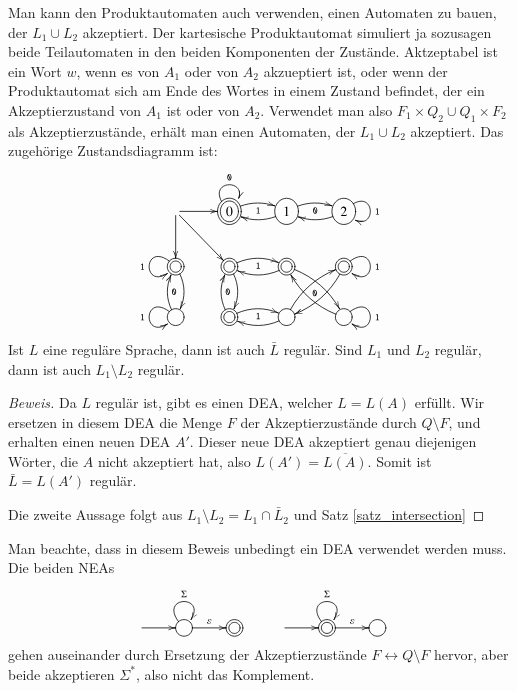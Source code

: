 Man kann den Produktautomaten auch
verwenden, einen Automaten zu bauen, der $L_1\cup L_2$
akzeptiert.
Der kartesische Produktautomat simuliert ja sozusagen
beide Teilautomaten in den beiden Komponenten der Zustände.
Aktzeptabel ist ein Wort $w$, wenn es von $A_1$
oder von $A_2$ akzueptiert ist, oder wenn der Produktautomat
sich am Ende des Wortes in einem Zustand befindet, der ein
Akzeptierzustand von $A_1$ ist oder von $A_2$.
Verwendet
man also $F_1\times Q_2\cup Q_1\times F_2$ als Akzeptierzustände,
erhält man einen Automaten, der $L_1\cup L_2$ akzeptiert.
Das zugehörige Zustandsdiagramm ist:
\[
\entrymodifiers={++[o][F]}
\xymatrix{
*+\txt{} \ar[r] \ar[d] \ar[dr]
	&*++[o][F=]{0} \ar@/^/[r]_{\tt 1} \ar@(ul,ur)^{\tt 0}
		&{1} \ar@/^/[l] \ar@/^/[r]_{\tt 0}
			&{2}\ar@(ur,dr)^{\tt 1} \ar@/^/[l]
\\
*++[o][F=]{} \ar@/^/[d] \ar@(ul,dl)_{\tt 1}
	&*++[o][F=]{} \ar@/^/[d]{\tt 0} \ar@/^/[r]_{\tt 1}
		&*++[o][F=]{} \ar@/^/[l] \ar@/^/[dr]_{\tt 0}
			&*++[o][F=]{}\ar@(ur,dr)^{\tt 1} \ar@/^/[dl]
\\
{} \ar@/^/[u]_{\tt 0} \ar@(ul,dl)_{\tt 1}
	&*++[o][F=]{} \ar@/^/[u]_{\tt 0} \ar@/^/[r]_{\tt 1}
		&{} \ar@/^/[l] \ar@/^/[ur]
			&{}\ar@(ur,dr)^{\tt 1} \ar@/^/[ul]
}
\]

\begin{satz}
\label{satz_regcomplement}
Ist $L$ eine reguläre Sprache, dann ist auch $\bar L$ regulär.
Sind $L_1$ und $L_2$ regulär, dann ist auch $L_1\setminus L_2$
regulär.
\end{satz}

\begin{proof}[Beweis]
Da $L$ regulär ist, gibt es einen DEA, welcher $L=L(A)$ erfüllt.
Wir ersetzen in diesem DEA die Menge $F$ der Akzeptierzustände
durch $Q\setminus F$, und erhalten einen neuen DEA $A'$.
Dieser neue DEA akzeptiert genau diejenigen Wörter, die $A$ nicht
akzeptiert hat, also $L(A')=\overline{L(A)}$.
Somit ist $\bar L=L(A')$ regulär.

Die zweite Aussage folgt aus $L_1\setminus L_2=L_1\cap\bar L_2$ und
Satz \ref{satz_intersection}
\end{proof}
Man beachte, dass in diesem Beweis unbedingt ein DEA verwendet werden
muss.
Die beiden NEAs
\[
\entrymodifiers={++[o][F]}
\xymatrix{
*+\txt{}\ar[r]
	&{}\ar@(ul,ur)^{\Sigma} \ar[r]^{\varepsilon}
		&*++[o][F=]{}
&
*+\txt{}\ar[r]
	&*++[o][F=]{}\ar@(ul,ur)^{\Sigma} \ar[r]^{\varepsilon}
		&{}
}
\]
gehen auseinander durch Ersetzung der Akzeptierzustände
$F\leftrightarrow Q\setminus F$ hervor, aber beide akzeptieren
$\Sigma^*$, also nicht das Komplement.

